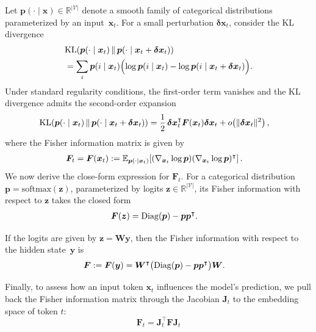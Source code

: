 \documentclass{article}
\begin{document}
Let $\bm{p}(\cdot\mid \bm{x}) \in \mathbb{R}^{|\mathcal{V}|}$ denote a smooth family of
categorical distributions parameterized by an input~$\bm{x}_t$.
For a small perturbation $\bm{\delta x}_t$, consider the KL divergence
\begin{align}
&\mathrm{KL}\!\left(
\bm{p}(\cdot\mid \bm{x}_t)
\,\middle\|\,
\bm{p}(\cdot\mid \bm{x}_t+\bm{\delta x}_t)
\right) \notag \\
&=
\sum_{i}
\bm{p}(i\mid \bm{x}_t)
\Bigl(
\log \bm{p}(i\mid \bm{x}_t)
-
\log \bm{p}(i\mid \bm{x}_t+\bm{\delta x}_t)
\Bigr).
\notag
\end{align}
Under standard regularity conditions, the first-order term vanishes and
the KL divergence admits the second-order expansion
\begin{align}
\mathrm{KL}\!\left(
\bm{p}(\cdot\mid \bm{x}_t)
\,\middle\|\,
\bm{p}(\cdot\mid \bm{x}_t+\bm{\delta x}_t)
\right)
&=
\frac{1}{2}\,
\bm{\delta x}_t^\intercal
\bm{F}(\bm{x}_t)
\bm{\delta x}_t
+
o\!\left(\|\bm{\delta x}_t\|^2\right),
\notag
\end{align}
where the Fisher information matrix is given by \cite{amari2000methods}
\begin{align}
\bm{F}_t = \bm{F}(\bm{x}_t)
&:=
\mathbb{E}_{\bm{p}(\cdot\mid \bm{x}_t)}
\!\left[
(\nabla_{\bm{x}_t} \log \bm{p})
(\nabla_{\bm{x}_t} \log \bm{p})^\intercal
\right].
\notag
\end{align}
We now derive the close-form expression for $\bm{F}_t$.
For a categorical distribution $\bm{p} = \mathrm{softmax}(\bm{z})$,
parameterized by logits $\bm{z} \in \mathbb{R}^{|\mathcal{V}|}$,
its Fisher information with respect to $\bm{z}$ takes the closed form
\cite{bishop2006pattern}
\begin{align}
\bm{F}(\bm{z})
&=
\mathrm{Diag}(\bm{p}) - \bm{p}\bm{p}^\intercal .
\notag
\end{align}

If the logits are given by $\bm{z} = \bm{W} \bm{y}$, then the Fisher
information with respect to the hidden state~$\bm{y}$ is
\begin{align}
\bm{F}:=\bm{F}(\bm{y})
&=
\bm{W}^\intercal
\bigl(
\mathrm{Diag}(\bm{p}) - \bm{p}\bm{p}^\intercal
\bigr)
\bm{W}.
\notag
\end{align}

Finally, to assess how an input token $\bm{x}_t$ influences the
model’s prediction, we pull back \cite{arvanitidis2022pullinginformationgeometry} the Fisher information matrix through the Jacobian $\bm{J}_t$ to the embedding space of token $t$:
\begin{equation}
\bm{F}_t = \bm{J}_t^\intercal \bm{F} \bm{J}_t  
\end{equation}
\end{document}
